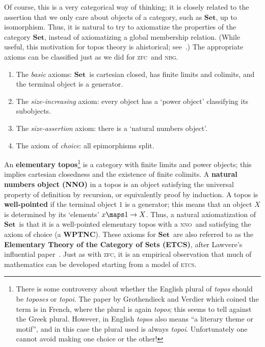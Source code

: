 \documentclass[12pt]{amsart}
\newcommand{\Set}{\ensuremath{\mathbf{Set}}}
\def\zfc{\textsc{zfc}}
\def\nbg{\textsc{nbg}}
\def\etcs{\textsc{etcs}}
\def\nno{\textsc{nno}}
\begin{document}
Of course, this is a very categorical way of thinking; it is closely
related to the assertion that we only care about objects of a
category, such as \Set, up to isomorphism.  Thus, it is natural to try
to axiomatize the properties of the category \Set, instead of
axiomatizing a global membership relation.  (While useful, this
motivation for topos theory is ahistorical;
see~\cite{mclarty:hist-topos}.)  The appropriate axioms can be
classified just as we did for \zfc\ and \nbg.
\begin{enumerate}
\item The \emph{basic} axioms: \Set\ is cartesian closed, has finite
  limits and colimits, and the terminal object is a generator.
\item The \emph{size-increasing} axiom: every object has a `power
  object' classifying its subobjects.
\item The \emph{size-assertion} axiom: there is a `natural numbers
  object'.
\item The axiom of \emph{choice}: all epimorphisms split.
\end{enumerate}
An \textbf{elementary topos}\footnote{There is some controversy about
  whether the English plural of \emph{topos} should be \emph{toposes}
  or \emph{topoi}.  The paper by Grothendieck and Verdier which coined
  the term is in French, where the plural is again \emph{topos}; this
  seems to tell against the Greek plural.  However, in English
  \emph{topos} also means ``a literary theme or motif'', and in this
  case the plural used is always \emph{topoi}.  Unfortunately one
  cannot avoid making one choice or the other!}  is a category with
finite limits and power objects; this implies cartesian closedness and
the existence of finite colimits.  A \textbf{natural numbers object
  (NNO)} in a topos is an object satisfying the universal property of
definition by recursion, or equivalently proof by induction.  A topos
is \textbf{well-pointed} if the terminal object $1$ is a generator;
this means that an object $X$ is determined by its `elements' $x\maps
1\to X$.  Thus, a natural axiomatization of \Set\ is that it is a
well-pointed elementary topos with a \nno\ and satisfying the axiom of
choice (a \textbf{WPTNC}).  These axioms for \Set\ are also referred
to as the \textbf{Elementary Theory of the Category of Sets (ETCS)},
after Lawvere's influential
paper~\cite{lawvere:etcs,lawvere:etcs-long}.  Just as with \zfc, it is
an empirical observation that much of mathematics can be developed
starting from a model of \etcs.
\end{document}
